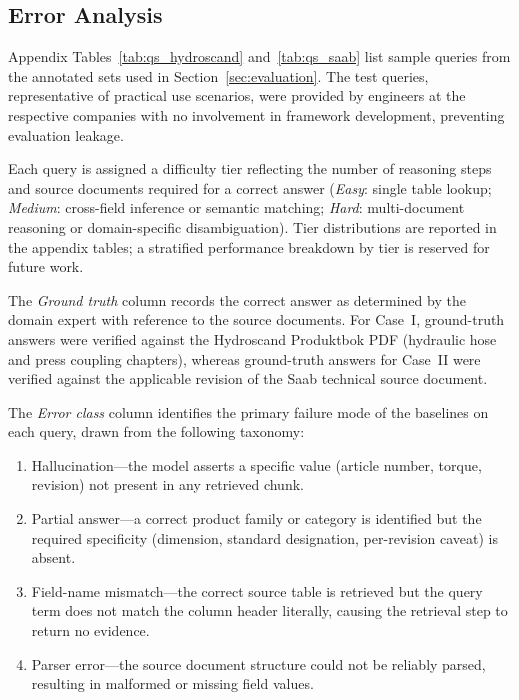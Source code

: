 \documentclass[largeformat]{interact}
\begin{document}
\subsection{Error Analysis}
\label{subsec:error_analysis}
Appendix Tables~\ref{tab:qs_hydroscand} and~\ref{tab:qs_saab} list sample queries from the annotated sets used in Section~\ref{sec:evaluation}. The test queries, representative of practical use scenarios, were provided by engineers at the respective companies with no involvement in framework development, preventing evaluation leakage.

Each query is assigned a difficulty tier reflecting the number of reasoning steps and source documents required for a correct answer (\emph{Easy}: single table lookup; \emph{Medium}: cross-field inference or semantic matching; \emph{Hard}: multi-document reasoning or domain-specific disambiguation). Tier distributions are reported in the appendix tables; a stratified performance breakdown by tier is reserved for future work.

The \emph{Ground truth} column records the correct answer as determined by the domain expert with reference to the source documents. For Case~I, ground-truth answers were verified against the Hydroscand Produktbok PDF (hydraulic hose and press coupling chapters), whereas ground-truth answers for Case~II were verified against the applicable revision of the Saab technical source document.

The \emph{Error class} column identifies the primary failure mode of the baselines on each query, drawn from the following taxonomy:
\begin{enumerate}[label=\roman*.]
    \item Hallucination---the model asserts a specific value (article number, torque, revision) not present in any retrieved chunk.
    \item Partial answer---a correct product family or category is identified but the required specificity (dimension, standard designation, per-revision caveat) is absent.
    \item Field-name mismatch---the correct source table is retrieved but the query term does not match the column header literally, causing the retrieval step to return no evidence.
    \item Parser error---the source document structure could not be reliably parsed, resulting in malformed or missing field values.
\end{enumerate}
\end{document}
